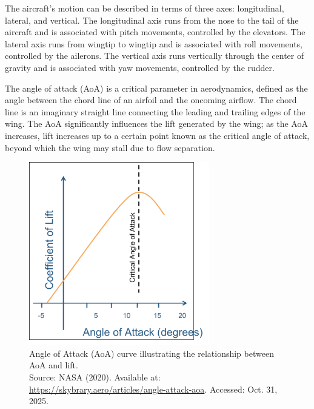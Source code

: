 The aircraft's motion can be described in terms of three axes: longitudinal, lateral, and vertical. The longitudinal axis runs from the nose to the tail of the aircraft and is associated with pitch movements, controlled by the elevators. The lateral axis runs from wingtip to wingtip and is associated with roll movements, controlled by the ailerons. The vertical axis runs vertically through the center of gravity and is associated with yaw movements, controlled by the rudder.

The angle of attack (AoA) is a critical parameter in aerodynamics, defined as the angle between the chord line of an airfoil and the oncoming airflow. The chord line is an imaginary straight line connecting the leading and trailing edges of the wing. The AoA significantly influences the lift generated by the wing; as the AoA increases, lift increases up to a certain point known as the critical angle of attack, beyond which the wing may stall due to flow separation.

\begin{figure}[H]
    \centering
    \includegraphics[width=0.7\textwidth]{figures/angle_of_attack_curve.png}
    \caption{Angle of Attack (AoA) curve illustrating the relationship between AoA and lift. \\ Source: NASA (2020). Available at: \url{https://skybrary.aero/articles/angle-attack-aoa}. Accessed: Oct. 31, 2025.}
    \label{fig:angle_of_attack_curve}
\end{figure}


